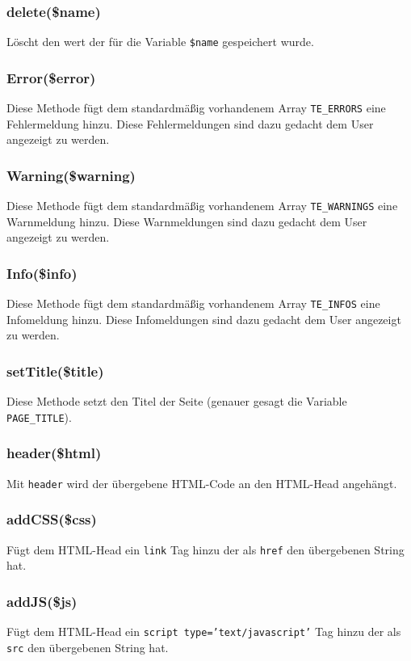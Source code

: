 \documentclass[a4paper,10pt]{article}
\begin{document}
\subsubsection{delete(\$name)}
L\"oscht den wert der f\"ur die Variable {\tt \$name} gespeichert wurde.

\subsubsection{Error(\$error)}
Diese Methode f\"ugt dem standardm\"a\ss{}ig vorhandenem Array {\tt TE\_ERRORS} eine Fehlermeldung hinzu. Diese Fehlermeldungen sind dazu gedacht dem User angezeigt zu werden.

\subsubsection{Warning(\$warning)}
Diese Methode f\"ugt dem standardm\"a\ss{}ig vorhandenem Array {\tt TE\_WARNINGS} eine Warnmeldung hinzu. Diese Warnmeldungen sind dazu gedacht dem User angezeigt zu werden.

\subsubsection{Info(\$info)}
Diese Methode f\"ugt dem standardm\"a\ss{}ig vorhandenem Array {\tt TE\_INFOS} eine Infomeldung hinzu. Diese Infomeldungen sind dazu gedacht dem User angezeigt zu werden.

\subsubsection{setTitle(\$title)}
Diese Methode setzt den Titel der Seite (genauer gesagt die Variable {\tt PAGE\_TITLE}).

\subsubsection{header(\$html)}
Mit {\tt header} wird der \"ubergebene HTML-Code an den HTML-Head angeh\"angt.

\subsubsection{addCSS(\$css)}
F\"ugt dem HTML-Head ein {\tt link} Tag hinzu der als {\tt href} den \"ubergebenen String hat.

\subsubsection{addJS(\$js)}
F\"ugt dem HTML-Head ein {\tt script type='text/javascript'} Tag hinzu der als {\tt src}
 den \"ubergebenen String hat.
\end{document}
